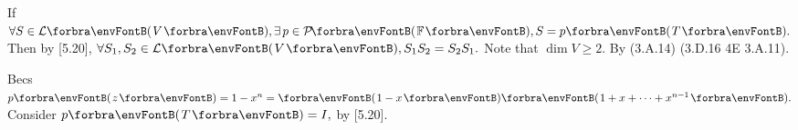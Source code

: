 If $\forall S\in\Lm{V},\exists\,p\in\PoFi,S=p\Par{T}.$ Then by [5.20], $\forall S_1,S_2\in\Lm{V},S_1S_2=S_2S_1.$\parSol{}
Note that $\dim V\geqslant 2.$ By (3.A.14) \OR (3.D.16 \OR 4E 3.A.11).\PfEnd
\SepLine


Becs $p\Par{z}=1-x^n=\Par{1-x}\Par{1+x+\dots+x^{n-1}}.$ Consider $p\Par{T}=I,$ by [5.20].\PfEnd
\SepLine


